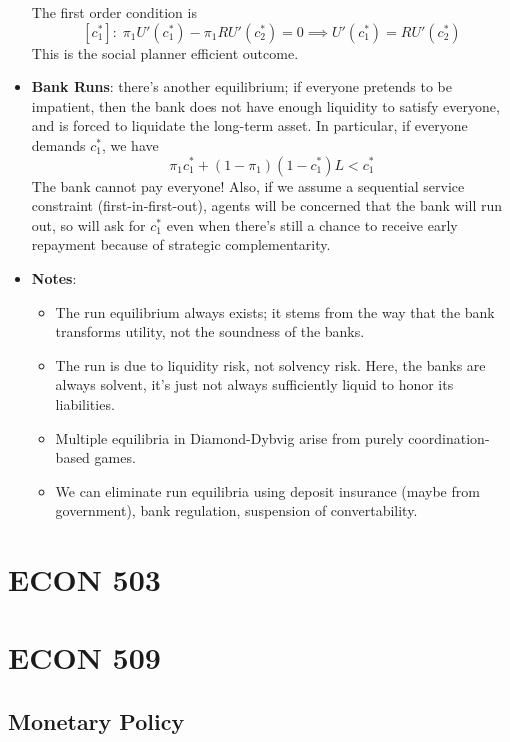 \documentclass[12pt]{article}
\begin{document}
\begin{itemize}
    The first order condition is
    \[[c_1^*]:\; \pi_1U'(c_1^*) -\pi_1 RU'(c_2^*) = 0 \implies U'(c_1^*) = RU'(c_2^*)\]
    This is the social planner efficient outcome. 
    \item \textbf{Bank Runs}: there's another equilibrium; if everyone pretends to be impatient, then the bank does not have enough liquidity to satisfy everyone, and is forced to liquidate the long-term asset. In particular, if everyone demands $c_1^*$, we have
    \[\pi_1c_1^* + (1-\pi_1)(1-c_1^*)L < c_1^*\]
    The bank cannot pay everyone! Also, if we assume a sequential service constraint (first-in-first-out), agents will be concerned that the bank will run out, so will ask for $c_1^*$ even when there's still a chance to receive early repayment because of strategic complementarity. 
    \item \textbf{Notes}:
    \begin{itemize}
        \item The run equilibrium always exists; it stems from the way that the bank transforms utility, not the soundness of the banks.
        \item The run is due to liquidity risk, not solvency risk. Here, the banks are always solvent, it's just not always sufficiently liquid to honor its liabilities.
        \item Multiple equilibria in Diamond-Dybvig arise from purely coordination-based games.
        \item We can eliminate run equilibria using deposit insurance (maybe from government), bank regulation, suspension of convertability.
    \end{itemize}
\end{itemize}

\section{ECON 503}

\section{ECON 509}

\subsection{Monetary Policy}
\end{document}
